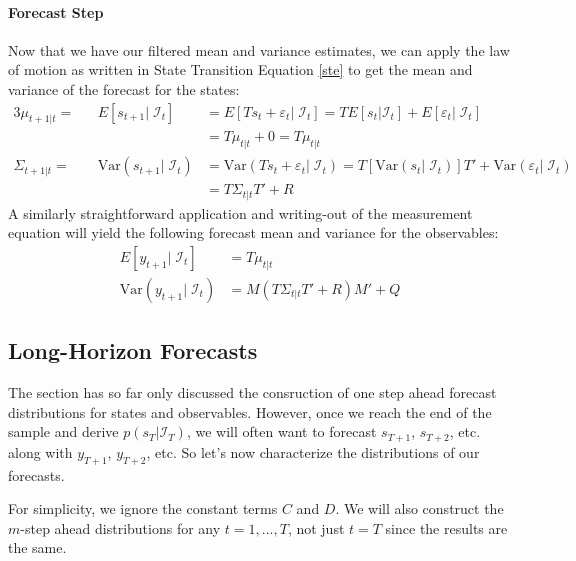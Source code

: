 \documentclass[a4paper,12pt]{article}
\begin{document}
\paragraph{Forecast Step} Now that we have our filtered
mean and variance estimates, we can apply the law of
motion as written in State Transition Equation \ref{ste} to get the mean and variance of the forecast for
the states:
\begin{alignat*}{3}
  \mu_{t+1|t} =&& E[s_{t+1}|\;\mathcal{I}_{t}] &= 
    E[Ts_t + \varepsilon_t |\;\mathcal{I}_{t}] = 
    TE[s_t | \mathcal{I}_{t}] 
    + E[\varepsilon_t |\;\mathcal{I}_{t}]  \\
    && &= T\mu_{t|t} + 0 = T\mu_{t|t} \\
  \Sigma_{t+1|t} = &&\text{Var}(s_{t+1}|\;\mathcal{I}_{t})
  &= \text{Var}(Ts_t + \varepsilon_t |\;\mathcal{I}_{t})
  = T[\text{Var}(s_t|\;\mathcal{I}_{t})]T'
  + \text{Var}(\varepsilon_t|\;\mathcal{I}_{t}) \\
  && &= T\Sigma_{t|t}T' + R
\end{alignat*}
A similarly straightforward application and writing-out of
the measurement equation will yield the following forecast
mean and variance for the observables:
\begin{align*}
  E[y_{t+1}|\;\mathcal{I}_{t}] &= T\mu_{t|t} \\
  \text{Var}(y_{t+1}|\;\mathcal{I}_{t})
    &= M\left(T\Sigma_{t|t}T' + R\right)M' + Q
\end{align*}

\subsection{Long-Horizon Forecasts}

The section has so far only discussed the consruction of one step ahead forecast distributions for states and observables. However, once we reach the end of the sample and derive $p(s_T | \mathcal{I}_{T})$, we will often want to forecast $s_{T+1}$, $s_{T+2}$, etc. along with $y_{T+1}$, $y_{T+2}$, etc. So let's now characterize the distributions of our forecasts. 

For simplicity, we ignore the constant terms $C$ and $D$. We will also construct the $m$-step ahead distributions for any $t=1,\ldots,T$, not just $t=T$ since the results are the same.
\end{document}
